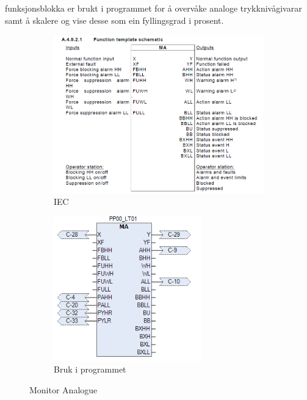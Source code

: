 funksjonsblokka er brukt i programmet for å overvåke analoge trykknivågivarar samt å skalere og vise desse som ein fyllingsgrad i prosent.

\begin{figure}[htbp]
    \centering
    \begin{subfigure}[b]{0.45\textwidth}
        \centering
        \includegraphics[width=1\textwidth]{Bilder/MABlokkIEC.png}
        \caption{IEC}\label{fig:Monitor Analogue blokk IEC}
    \end{subfigure}
    \hfill
    \begin{subfigure}[b]{0.45\textwidth}
        \centering
        \includegraphics[width=0.7\textwidth]{Bilder/MABlokkIProgrammet.png}
        \caption{Bruk i programmet}\label{fig:Monitor Analogue blokk i programmet}
    \end{subfigure}
    \caption{Monitor Analogue}\label{fig:Monitor Analogue}
\end{figure}
\newpage

